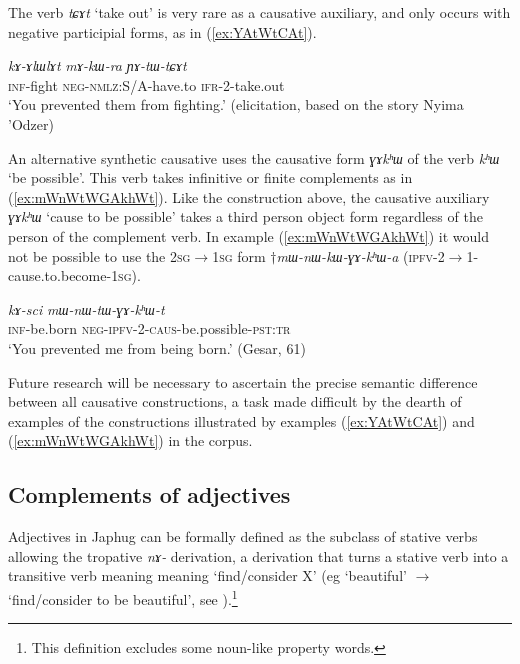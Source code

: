 \documentclass[oneside,a4paper,11pt]{article}
\newcommand{\ipa}[1]{\textit{\phon#1}}
\newcommand{\jpg}[2]{\ipa{#1} `#2'}
\newcommand{\refb}[1]{(\ref{#1})}
\begin{document}
The verb \jpg{tɕɤt}{take out} is very rare as a causative auxiliary, and only occurs with negative participial forms, as in \refb{ex:YAtWtCAt}.

\begin{exe}
\ex \label{ex:YAtWtCAt}
 \gll  	  \ipa{kɤ-ɤlɯlɤt} 	\ipa{mɤ-kɯ-ra} 	\ipa{ɲɤ-tɯ-tɕɤt} \\
 \textsc{inf}-fight \textsc{neg-nmlz}:S/A-have.to \textsc{ifr}-2-take.out \\
 \glt `You prevented them from fighting.' (elicitation, based on the story Nyima 'Odzer)
   \end{exe}  

An alternative synthetic causative uses the causative form \ipa{ɣɤkʰɯ} of the verb \jpg{kʰɯ}{be possible}. This verb takes infinitive or finite complements as in \refb{ex:mWnWtWGAkhWt}. Like the construction above, the causative auxiliary \jpg{ɣɤkʰɯ}{cause to be possible} takes a third person object form regardless of the person of the complement verb. In example \refb{ex:mWnWtWGAkhWt} it would not be possible to use the \textsc{2sg$\rightarrow$1sg} form $\dagger$\ipa{mɯ-nɯ-kɯ-ɣɤ-kʰɯ-a} (\textsc{ipfv}-2$\rightarrow$1-cause.to.become-\textsc{1sg}).

\begin{exe}
\ex \label{ex:mWnWtWGAkhWt}
 \gll  	 	\ipa{kɤ-sci}  	\ipa{mɯ-nɯ-tɯ-ɣɤ-kʰɯ-t}  \\
\textsc{inf}-be.born \textsc{neg-ipfv-2-caus}-be.possible-\textsc{pst:tr} \\
 \glt `You prevented me from being born.' (Gesar, 61)
   \end{exe}  

Future research will be necessary to ascertain the precise semantic difference between all causative constructions, a task made difficult by the dearth of examples of the constructions illustrated by examples \refb{ex:YAtWtCAt} and \refb{ex:mWnWtWGAkhWt} in the corpus.
 
\subsection{Complements of adjectives} \label{sec:adj}
Adjectives in Japhug can be formally defined as the subclass of stative verbs allowing the tropative \ipa{nɤ-} derivation, a derivation that turns a stative verb into a transitive verb meaning meaning `find/consider X'  (eg `beautiful' $\rightarrow$ `find/consider to be beautiful', see \citealt{jacques13tropative}).\footnote{This definition excludes some noun-like property words.} 
\end{document}
